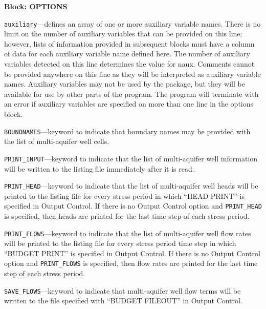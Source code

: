 
\item \textbf{Block: OPTIONS}

\begin{description}
\item \texttt{auxiliary}---defines an array of one or more auxiliary variable names.  There is no limit on the number of auxiliary variables that can be provided on this line; however, lists of information provided in subsequent blocks must have a column of data for each auxiliary variable name defined here.   The number of auxiliary variables detected on this line determines the value for naux.  Comments cannot be provided anywhere on this line as they will be interpreted as auxiliary variable names.  Auxiliary variables may not be used by the package, but they will be available for use by other parts of the program.  The program will terminate with an error if auxiliary variables are specified on more than one line in the options block.

\item \texttt{BOUNDNAMES}---keyword to indicate that boundary names may be provided with the list of multi-aquifer well cells.

\item \texttt{PRINT\_INPUT}---keyword to indicate that the list of multi-aquifer well information will be written to the listing file immediately after it is read.

\item \texttt{PRINT\_HEAD}---keyword to indicate that the list of multi-aquifer well heads will be printed to the listing file for every stress period in which ``HEAD PRINT'' is specified in Output Control.  If there is no Output Control option and \texttt{PRINT\_HEAD} is specified, then heads are printed for the last time step of each stress period.

\item \texttt{PRINT\_FLOWS}---keyword to indicate that the list of multi-aquifer well flow rates will be printed to the listing file for every stress period time step in which ``BUDGET PRINT'' is specified in Output Control.  If there is no Output Control option and \texttt{PRINT\_FLOWS} is specified, then flow rates are printed for the last time step of each stress period.

\item \texttt{SAVE\_FLOWS}---keyword to indicate that multi-aquifer well flow terms will be written to the file specified with ``BUDGET FILEOUT'' in Output Control.


\end{description}
